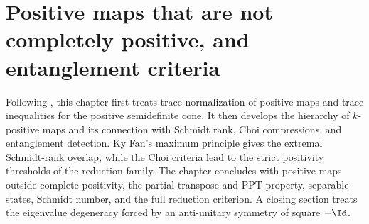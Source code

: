 \chapter{Positive maps that are not completely positive, and entanglement criteria}\label{ch:positive_not_cp}

Following \cite[Chapter~3]{Wolf2012Quantum}, this chapter first treats trace
normalization of positive maps and trace inequalities for the positive
semidefinite cone. It then develops the hierarchy of $k$-positive maps and its
connection with Schmidt rank, Choi compressions, and entanglement detection.
Ky Fan's maximum principle gives the extremal Schmidt-rank overlap, while the
Choi criteria lead to the strict positivity thresholds of the reduction
family. The chapter concludes with positive maps outside complete positivity,
the partial transpose and PPT property, separable states, Schmidt number, and
the full reduction criterion. A closing section treats the eigenvalue degeneracy
forced by an anti-unitary symmetry of square $-\Id$.









